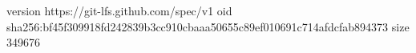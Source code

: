 version https://git-lfs.github.com/spec/v1
oid sha256:bf45f309918fd242839b3cc910cbaaa50655c89ef010691c714afdcfab894373
size 349676

